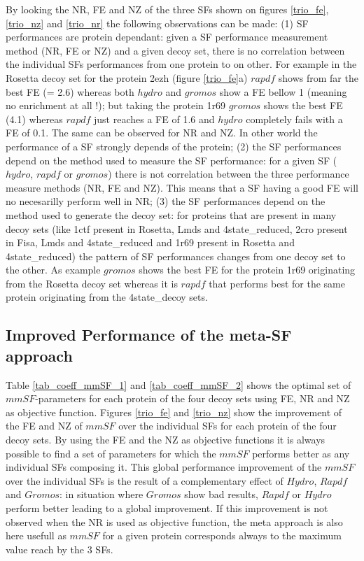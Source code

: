 \documentclass[a4paper,20pt,notitlepage,openbib]{article}
\begin{document}
By looking the NR, FE and NZ of the three SFs shown on figures \ref{trio_fe},  \ref{trio_nz} and \ref{trio_nr} the following observations can be made:  (1) SF performances are protein dependant: given a SF performance measurement method (NR, FE or NZ) and a given decoy set, there is no correlation between the individual SFs performances from one protein to on other. For example in the Rosetta decoy set for the protein 2ezh (figure \ref{trio_fe}a) $rapdf$ shows from far the best FE (= 2.6) whereas both $hydro$ and $gromos$ show a FE bellow 1 (meaning no enrichment at all !); but taking the protein 1r69 $gromos$ shows the best FE (4.1) whereas $rapdf$ just reaches a FE of 1.6 and $hydro$ completely fails with a FE of 0.1. The same can be observed for NR and NZ. In other world the performance of a SF strongly depends of the protein; (2) the SF performances depend on the method used to measure the SF performance: for a given SF ($hydro$, $rapdf$ or $gromos$) there is not correlation between the three performance measure methods (NR, FE and NZ). This means that a SF having a good FE will no necesarilly perform well in NR; (3) the SF performances depend on the method used to generate the decoy set: for proteins that are present in many decoy sets (like 1ctf present in Rosetta, Lmds and 4state\_reduced, 2cro present in Fisa, Lmds and 4state\_reduced and 1r69 present in Rosetta and 4state\_reduced) the pattern of SF performances changes from one decoy set to the other. As example $gromos$ shows the best FE for the protein 1r69 originating from the Rosetta decoy set whereas it is $rapdf$ that performs best for the same protein originating from the 4state\_decoy sets.
\subsection{Improved Performance of the meta-SF approach}
 Table \ref{tab_coeff_mmSF_1} and \ref{tab_coeff_mmSF_2} shows the optimal set of $mmSF$-parameters for each protein of the four decoy sets using FE, NR and NZ as objective function. Figures \ref{trio_fe} and \ref{trio_nz} show the improvement of the FE and NZ of $mmSF$ over the individual SFs for each protein of the four decoy sets. By using the FE and the NZ as objective functions it is always possible to find a set of parameters for which the $mmSF$ performs better as any individual SFs composing it. This global performance improvement of the $mmSF$ over the individual SFs is the result of a complementary effect of $Hydro$, $Rapdf$ and $Gromos$: in situation where $Gromos$ show bad results, $Rapdf$ or $Hydro$ perform better leading to a global improvement. If this improvement is not observed when the NR is used as objective function, the meta approach is also here usefull as $mmSF$ for a given protein corresponds always to the maximum value reach by the 3 SFs.
\end{document}
